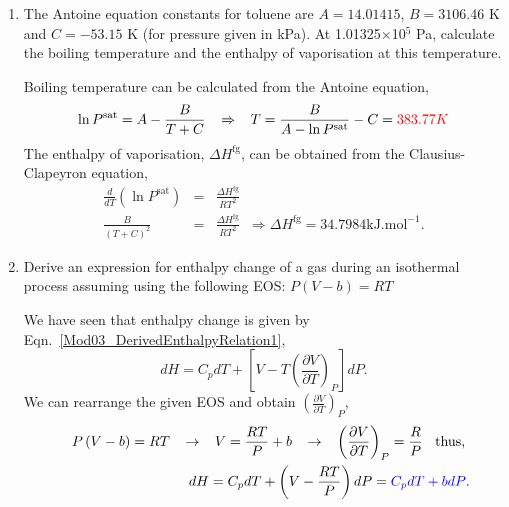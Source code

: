 \documentclass[12pts,a4paper,amsmath,amssymb,floatfix]{article}%
\newcommand{\frc}{\displaystyle\frac}
\newcommand{\red}{\textcolor{red}}
\newcommand{\blue}{\textcolor{blue}}
\newcommand{\Partial}[3][error]{\left(\frc{\partial #1}{\partial #2}\right)_{#3}}
\begin{document}
\begin{enumerate}[1)]
\clearpage
\item\label{Mod03Ex03} The Antoine equation constants for toluene are $A=14.01415$, $B=3106.46$ K and $C=-53.15$ K (for pressure given in kPa). At 1.01325$\times$10$^{5}$ Pa, calculate the boiling temperature and the enthalpy of vaporisation at this temperature.

     Boiling temperature can be calculated from the Antoine equation,
       \begin{displaymath}
          \ln{P^{\text{sat}}} = A - \frc{B}{T+C} \;\;\;\Rightarrow \;\;\; T = \frc{B}{A-\ln{P^{\text{sat}}}} - C = \red{383.77 K}
       \end{displaymath}
The enthalpy of vaporisation, $\Delta H^{\text{fg}}$, can be obtained from the Clausius-Clapeyron equation,
         \begin{eqnarray}
            \frc{d}{dT} \left(\ln{P^{\text{sat}}}\right) &=& \frc{\Delta H^{\text{fg}}}{RT^{2}} \nonumber \\
             \frc{B}{\left(T+C\right)^{2}} &=&  \frc{\Delta H^{\text{fg}}}{RT^{2}} \;\;\Longrightarrow \Delta H^{\text{fg}} = 34.7984 \text{kJ.mol}^{-1}. \nonumber
         \end{eqnarray}
 
\clearpage

\item\label{Mod03Ex04} Derive an expression for enthalpy change of a gas during an isothermal process assuming using the following EOS: $P\left(V-b\right)=RT$

     We have seen that enthalpy change is given by Eqn.~\ref{Mod03_DerivedEnthalpyRelation1},
    \begin{displaymath}
       dH = C_{p}dT + \left[V - T\Partial[V]{T}{P}\right]dP.
    \end{displaymath}
    We can rearrange the given EOS and obtain $\Partial[V]{T}{P}$,
    \begin{eqnarray}
       && P\left(V-b\right)=RT \;\;\;\rightarrow\;\;\; V = \frc{RT}{P} + b \;\;\;\rightarrow\;\;\; \Partial[V]{T}{P} = \frc{R}{P}\;\;\text{ thus, } \nonumber \\
       && dH = C_{p}dT + \left(V - \frc{RT}{P}\right)dP = \blue{C_{p}dT + bdP}. \nonumber 
    \end{eqnarray}
    
\clearpage
    
\clearpage
 

\end{enumerate}
\end{document}
